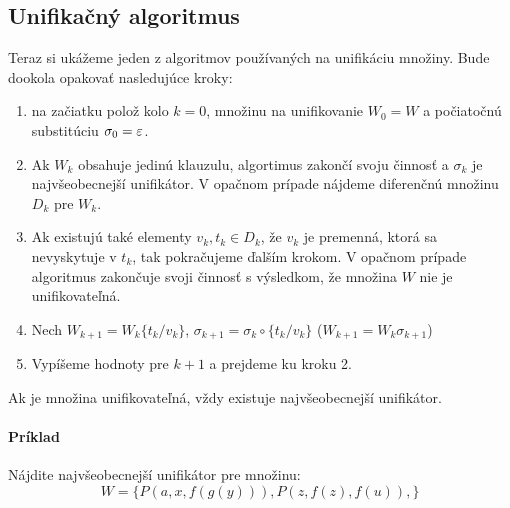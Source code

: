 \subsection{Unifikačný algoritmus}
\startFIXME

Teraz si ukážeme jeden z algoritmov používaných na unifikáciu množiny. Bude
dookola opakovať nasledujúce kroky:
\begin{enumerate}
    \item na začiatku polož kolo $k=0$, množinu na unifikovanie 
        $W_0 = W$ a počiatočnú substitúciu  $\sigma_0 = \varepsilon$.

    \item Ak $W_k$ obsahuje jedinú klauzulu, algortimus zakončí svoju činnosť
        a $\sigma_k$ je najvšeobecnejší unifikátor.
        V opačnom prípade nájdeme diferenčnú množinu $D_k$ pre $W_k$.

    \item Ak existujú také elementy $v_k,t_k \in D_k$, že $v_k$ je
        premenná, ktorá sa nevyskytuje v $t_k$, tak pokračujeme ďalším
        krokom.
        V opačnom prípade algoritmus zakončuje svoji činnosť
        s výsledkom, že množina $W$ nie je unifikovateľná.

    \item Nech $W_{k+1} = W_k \{t_k/v_k\}$, $\sigma_{k+1} = \sigma_k \circ
    \{t_k/v_k\}$ ($W_{k+1} = W_k \sigma_{k+1}$)

    \item Vypíšeme hodnoty pre $k+1$ a prejdeme ku kroku 2.
\end{enumerate}


Ak je množina unifikovateľná, vždy existuje najvšeobecnejší unifikátor.

\paragraph{Príklad}
Nájdite najvšeobecnejší unifikátor pre množinu: $$W=\{ P(a,x,f(g(y))),
P(z,f(z),f(u)), \}$$

